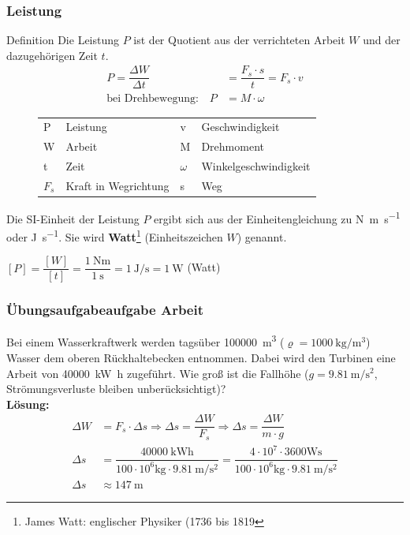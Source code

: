 \documentclass{beamer}
\begin{document}
{
  \frametitle{Leistung}
\begin{block}{Definition}
Die Leistung $P$ ist der Quotient aus der verrichteten Arbeit $W$ und der dazugehörigen Zeit $t$.\\
\begin{align}
P=\dfrac{\Delta W}{\Delta t}&=\dfrac{F_s\cdot s}{t}=F_s\cdot v\\
\text{bei Drehbewegung:}\quad P&=M\cdot\omega
\end{align}
\end{block}
\begin{figure}
\begin{tabular}{l l l l}
P & Leistung & v & Geschwindigkeit \\ 
W & Arbeit & M & Drehmoment \\ 
t & Zeit & $\omega$ & Winkelgeschwindigkeit \\ 
$F_s$ & Kraft in Wegrichtung & s & Weg \\ 
\end{tabular}
\end{figure}
Die SI-Einheit der Leistung $P$ ergibt sich aus der Einheitengleichung zu \si{\newton\meter\per\second} oder \si{\joule\per\second}. Sie wird \textbf{Watt}\footnote{James Watt: englischer Physiker (1736 bis 1819}  (Einheitszeichen $W$) genannt. 
	\begin{tcolorbox}	  
	  $[P]=\dfrac{[W]}{[t]}=\dfrac{\SI{1}{\newton\meter}}{\SI{1}{\second}}=\SI{1}{\joule\per\second}=\SI{1}{\watt}$ (Watt)
	\end{tcolorbox}
}

\frame
{
  \frametitle{Übungsaufgabeaufgabe Arbeit}
{
Bei einem Wasserkraftwerk werden tagsüber \SI{100000}{\cubic\meter} ($\varrho=\SI{1000}{\kilogram\per\cubic\meter}$) Wasser dem oberen Rückhaltebecken entnommen. Dabei wird den Turbinen eine Arbeit von \SI{40000}{\kilo\watt\hour} zugeführt. Wie groß ist die Fallhöhe ($g=\SI{9,81}{\meter\per\square\second}$, Strömungsverluste bleiben unberücksichtigt)?\\
}
{
\textbf{Lösung:}	
	\begin{align*}
	\Delta W&=F_s\cdot \Delta s\Rightarrow\Delta s=\dfrac{\Delta W}{F_s}\Rightarrow\Delta s=\dfrac{\Delta W}{m\cdot g}\\
	\Delta s&=\dfrac{\SI{40000}{\kilo\watt\hour}}{100\cdot 10^6\si{\kilo\gram}\cdot \SI{9,81}{\meter\per\square\second}}=\dfrac{4\cdot 10^7\cdot 3600\si{\watt\second}}{100\cdot 10^6\si{\kilo\gram}\cdot \SI{9,81}{\meter\per\square\second}}\\
	\Delta s&\approx\SI{147}{\meter}
	\end{align*}
}
}
\end{document}
